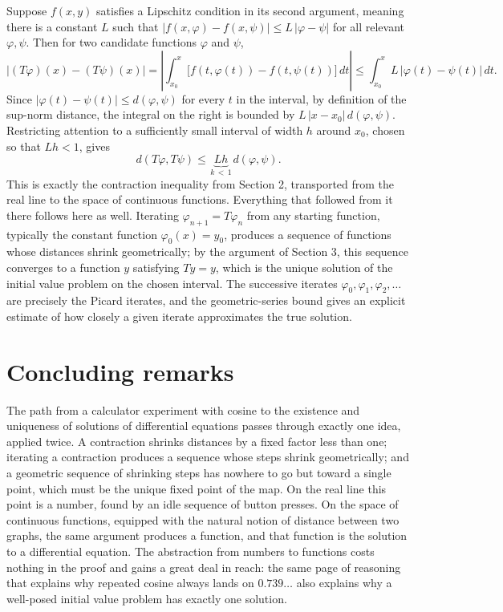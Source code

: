 \documentclass{essay}
\begin{document}
Suppose $f(x, y)$ satisfies a Lipschitz condition in its second
argument, meaning there is a constant $L$ such that
$|f(x, \varphi) - f(x, \psi)| \le L\,|\varphi - \psi|$ for all
relevant $\varphi, \psi$. Then for two candidate functions $\varphi$
and $\psi$,
\[
  |(T\varphi)(x) - (T\psi)(x)|
  = \left| \int_{x_0}^{x} \big[ f(t, \varphi(t)) - f(t, \psi(t)) \big]\, dt \right|
  \le \int_{x_0}^{x} L\, |\varphi(t) - \psi(t)|\, dt.
\]
Since $|\varphi(t) - \psi(t)| \le d(\varphi, \psi)$ for every $t$ in
the interval, by definition of the sup-norm distance, the integral on
the right is bounded by $L\,|x - x_0|\, d(\varphi, \psi)$. Restricting
attention to a sufficiently small interval of width $h$ around $x_0$,
chosen so that $Lh < 1$, gives
\[
  d(T\varphi, T\psi) \le \underbrace{Lh}_{\,k \,<\, 1\,} d(\varphi, \psi).
\]
This is exactly the contraction inequality from Section 2, transported
from the real line to the space of continuous functions. Everything
that followed from it there follows here as well. Iterating
$\varphi_{n+1} = T\varphi_n$ from any starting function, typically the
constant function $\varphi_0(x) = y_0$, produces a sequence of
functions whose distances shrink geometrically; by the argument of
Section 3, this sequence converges to a function $y$ satisfying
$Ty = y$, which is the unique solution of the initial value problem
on the chosen interval. The successive iterates $\varphi_0, \varphi_1,
\varphi_2, \ldots$ are precisely the Picard iterates, and the
geometric-series bound gives an explicit estimate of how closely a
given iterate approximates the true solution.

\section{Concluding remarks}

The path from a calculator experiment with cosine to the existence
and uniqueness of solutions of differential equations passes through
exactly one idea, applied twice. A contraction shrinks distances by a
fixed factor less than one; iterating a contraction produces a
sequence whose steps shrink geometrically; and a geometric sequence
of shrinking steps has nowhere to go but toward a single point, which
must be the unique fixed point of the map. On the real line this
point is a number, found by an idle sequence of button presses. On
the space of continuous functions, equipped with the natural notion
of distance between two graphs, the same argument produces a
function, and that function is the solution to a differential
equation. The abstraction from numbers to functions costs nothing in
the proof and gains a great deal in reach: the same page of reasoning
that explains why repeated cosine always lands on $0.739\ldots$ also
explains why a well-posed initial value problem has exactly one
solution.
\end{document}
